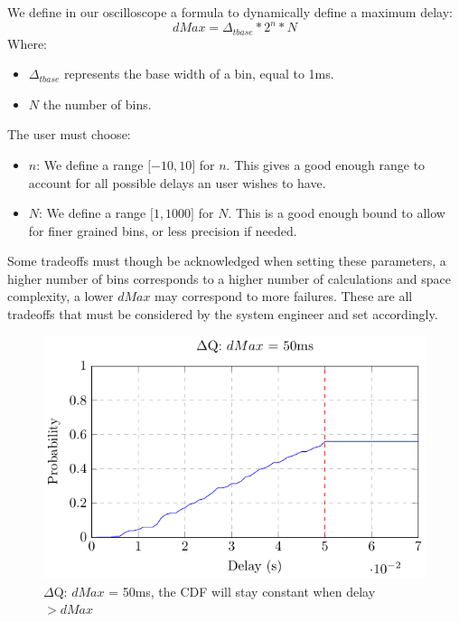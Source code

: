 We define in our oscilloscope a formula to dynamically define a maximum delay:
\begin{equation}
    dMax = \Delta_{t base} * 2^n * N  
    \label{eq:dMax}
\end{equation}
Where:
\begin{itemize}
    \item $\Delta_{t base}$ represents the base width of a bin, equal to 1ms.
    \item $N$ the number of bins.
\end{itemize}

The user must choose:
\begin{itemize}
    \item $n$: We define a range $\lbrack -10, 10 \rbrack$ for $n$. This gives a good enough range to account for all possible delays an user wishes to have.
    \item $N$: We define a range $\lbrack 1, 1000 \rbrack$ for $N$. This is a good enough bound to allow for finer grained bins, or less precision if needed. 
\end{itemize}

Some tradeoffs must though be acknowledged when setting these parameters, a higher number of bins corresponds to a higher number of calculations and space complexity, a lower $dMax$ may correspond to more failures. These are all tradeoffs that must be considered by the system engineer and set accordingly.
    \begin{figure}[H]
        \begin{center}
            \includegraphics[scale = 1.2]{tikz/cdf_dmax.pdf}
        \end{center}
        \caption{$\Delta$Q: $dMax$ = 50ms, the CDF will stay constant when delay $> dMax$}
    \end{figure}

